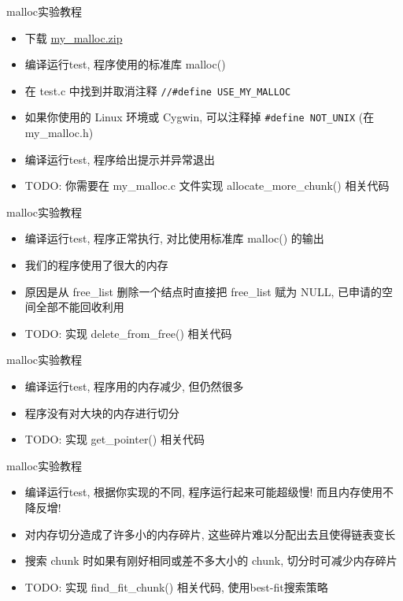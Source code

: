 \begin{frame}[fragile]{malloc实验教程}
    \begin{itemize}[<+- | alert@+>]
        \item 下载 \href{http://problemoverflow.top/download/my\_malloc.zip}{my\_malloc.zip}
        \item 编译运行test, 程序使用的标准库 malloc()
        \item 在 test.c 中找到并取消注释 \texttt{//\#define USE\_MY\_MALLOC}
        \item 如果你使用的 Linux 环境或 Cygwin, 可以注释掉 \texttt{\#define NOT\_UNIX} (在 my\_malloc.h)
        \item 编译运行test, 程序给出提示并异常退出
        \item TODO: 你需要在 my\_malloc.c 文件实现 allocate\_more\_chunk() 相关代码
    \end{itemize}
\end{frame}

\begin{frame}[fragile]{malloc实验教程}
    \begin{itemize}[<+- | alert@+>]
        \item 编译运行test, 程序正常执行, 对比使用标准库 malloc() 的输出
        \item 我们的程序使用了很大的内存
        \item 原因是从 free\_list 删除一个结点时直接把 free\_list 赋为 NULL, 已申请的空间全部不能回收利用
        \item TODO: 实现 delete\_from\_free() 相关代码
    \end{itemize}
\end{frame}

\begin{frame}[fragile]{malloc实验教程}
    \begin{itemize}[<+- | alert@+>]
        \item 编译运行test, 程序用的内存减少, 但仍然很多
        \item 程序没有对大块的内存进行切分
        \item TODO: 实现 get\_pointer() 相关代码
    \end{itemize}
\end{frame}

\begin{frame}[fragile]{malloc实验教程}
    \begin{itemize}[<+- | alert@+>]
        \item 编译运行test, 根据你实现的不同, 程序运行起来可能超级慢! 而且内存使用不降反增!
        \item 对内存切分造成了许多小的内存碎片, 这些碎片难以分配出去且使得链表变长
        \item 搜索 chunk 时如果有刚好相同或差不多大小的 chunk, 切分时可减少内存碎片
        \item TODO: 实现 find\_fit\_chunk() 相关代码, 使用best-fit搜索策略
    \end{itemize}
\end{frame}

